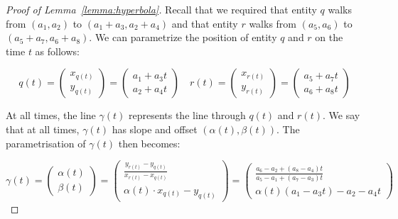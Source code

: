 \documentclass[a4paper, UKenglish]{lipics-v2018}
\begin{document}
\begin{proof}[Proof of Lemma~\ref{lemma:hyperbola}]
Recall that we required that entity $q$ walks from $(a_1, a_2)$ to $(a_1 + a_3, a_2 + a_4)$ and that entity $r$ walks from $(a_5, a_6)$ to $(a_5 + a_7, a_6 + a_8)$. We can parametrize the position of entity $q$ and $r$ on the time $t$ as follows:

\begin{equation}
    \label{eq:line}
     q(t) = \left( \begin{array}{c}
         x_{q(t)}  \\
         y_{q(t)} 
    \end{array}  \right) = 
    \left( \begin{array}{c}
         a_1 + a_3 t \\
         a_2 + a_4 t
    \end{array}  \right)  \quad
      r(t) = \left( \begin{array}{c}
         x_{r(t)}  \\
         y_{r(t)} 
    \end{array}  \right) = 
    \left( \begin{array}{c}
         a_5 + a_7 t \\
         a_6 + a_8 t
    \end{array}  \right) 
\end{equation}


At all times, the line $\gamma(t)$ represents the line through $q(t)$ and $r(t)$. We say that at all times, $\gamma(t)$ has slope and offset $(\alpha(t), \beta(t))$. The parametrisation of $\gamma(t)$ then becomes:

\begin{equation}
\label{eq:curve}
   \gamma(t) = \left( \begin{array}{c}
         \alpha(t)  \\
         \beta(t) 
    \end{array}  \right) = 
    \left( \begin{array}{c}
         \frac{y_{r(t)} - y_{q(t)}}{x_{r(t)} - x_{q(t)}}  \\
         \alpha(t)\cdot x_{q(t)} - y_{q(t)}
    \end{array}  \right) =
    \left( \begin{array}{c}
         \frac{ a_6 - a_2 + (a_8 - a_4) t}
      { a_5 - a_1  + (a_7 - a_3) t }  \\
         \alpha(t) (a_1 - a_3 t) - a_2 - a_4 t 
    \end{array}  \right)
  \end{equation}
  

\end{proof}
\end{document}
